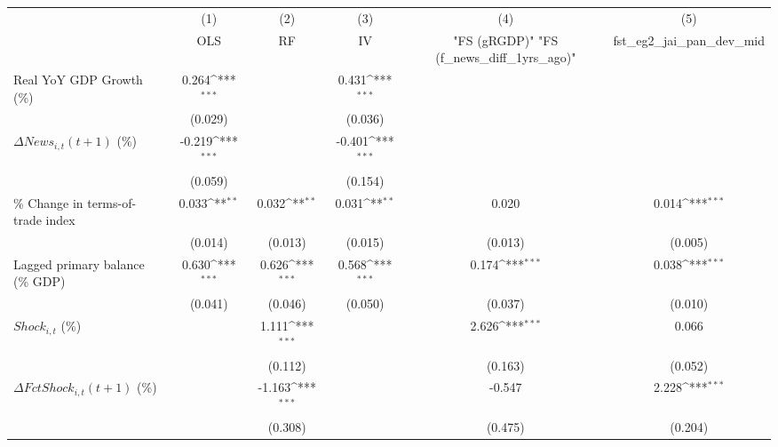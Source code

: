 {
\def\sym#1{\ifmmode^{#1}\else\(^{#1}\)\fi}
\begin{tabular}{l*{5}{c}}
\toprule
                    &\multicolumn{1}{c}{(1)}&\multicolumn{1}{c}{(2)}&\multicolumn{1}{c}{(3)}&\multicolumn{1}{c}{(4)}&\multicolumn{1}{c}{(5)}\\
                    &\multicolumn{1}{c}{OLS}&\multicolumn{1}{c}{RF}&\multicolumn{1}{c}{IV}&\multicolumn{1}{c}{ "FS (gRGDP)"  "FS (f_news_diff_1yrs_ago)" }&\multicolumn{1}{c}{fst_eg2_jai_pan_dev_mid}\\
\midrule
Real YoY GDP Growth (\%)&       0.264\sym{***}&                     &       0.431\sym{***}&                     &                     \\
                    &     (0.029)         &                     &     (0.036)         &                     &                     \\
\addlinespace
$ \Delta News_{i,t}(t+1)$ (\%)&      -0.219\sym{***}&                     &      -0.401\sym{***}&                     &                     \\
                    &     (0.059)         &                     &     (0.154)         &                     &                     \\
\addlinespace
\% Change in terms-of-trade index&       0.033\sym{**} &       0.032\sym{**} &       0.031\sym{**} &       0.020         &       0.014\sym{***}\\
                    &     (0.014)         &     (0.013)         &     (0.015)         &     (0.013)         &     (0.005)         \\
\addlinespace
Lagged primary balance (\% GDP)&       0.630\sym{***}&       0.626\sym{***}&       0.568\sym{***}&       0.174\sym{***}&       0.038\sym{***}\\
                    &     (0.041)         &     (0.046)         &     (0.050)         &     (0.037)         &     (0.010)         \\
\addlinespace
$ Shock_{i,t}$ (\%) &                     &       1.111\sym{***}&                     &       2.626\sym{***}&       0.066         \\
                    &                     &     (0.112)         &                     &     (0.163)         &     (0.052)         \\
\addlinespace
$ \Delta FctShock_{i,t}(t+1)$ (\%)&                     &      -1.163\sym{***}&                     &      -0.547         &       2.228\sym{***}\\
                    &                     &     (0.308)         &                     &     (0.475)         &     (0.204)         \\

\end{tabular}}
